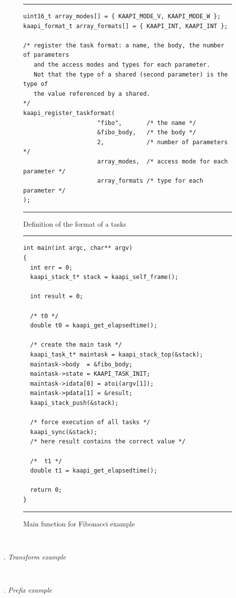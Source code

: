 \documentclass{report}
\renewcommand{\subsubsection}[1]{~\\ \addtocounter{subsubsection}{1} \noindent\textit{
\thesubsubsection. #1\\}}
\begin{document}
\begin{figure}
\hrule
\begin{verbatim}
uint16_t array_modes[] = { KAAPI_MODE_V, KAAPI_MODE_W };
kaapi_format_t array_formats[] = { KAAPI_INT, KAAPI_INT };

/* register the task format: a name, the body, the number of parameters
   and the access modes and types for each parameter.
   Not that the type of a shared (second parameter) is the type of 
   the value referenced by a shared.
*/
kaapi_register_taskformat(
                     "fibo",       /* the name */
                     &fibo_body,   /* the body */
                     2,            /* number of parameters */
                     array_modes,  /* access mode for each parameter */
                     array_formats /* type for each parameter */
); 
\end{verbatim}
\hrule
\caption{Definition of the format of a tasks}
\label{fig:fiboformat}
\end{figure}

\begin{figure}[!h]
\hrule
\begin{verbatim}
int main(int argc, char** argv)
{
  int err = 0;
  kaapi_stack_t* stack = kaapi_self_frame();

  int result = 0;
  
  /* t0 */
  double t0 = kaapi_get_elapsedtime();
  
  /* create the main task */
  kaapi_task_t* maintask = kaapi_stack_top(&stack);
  maintask->body  = &fibo_body;
  maintask->state = KAAPI_TASK_INIT;
  maintask->idata[0] = atoi(argv[1]);
  maintask->pdata[1] = &result;
  kaapi_stack_push(&stack);
  
  /* force execution of all tasks */
  kaapi_sync(&stack);
  /* here result contains the correct value */

  /*  t1 */
  double t1 = kaapi_get_elapsedtime();

  return 0;
}
\end{verbatim}
\hrule
\caption{Main function for Fibonacci example}
\label{fig:fibomain}
\end{figure}


\subsubsection{Transform example}

\subsubsection{Prefix example}
\end{document}
